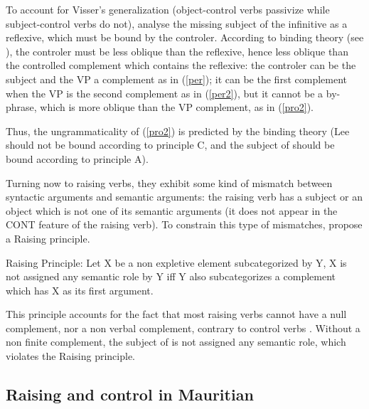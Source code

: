 \documentclass[output=paper]{langsci/langscibook}
\begin{document}
To account for Visser's generalization (object-control verbs passivize  while subject-control verbs do not), \citet{SagandPollard1991} analyse the missing subject of the infinitive as a reflexive, which must be bound by the controler. According to binding theory (see ), the controler must be less oblique than the reflexive, hence less oblique than the controlled complement which contains the reflexive: the controler can be the subject and the VP a complement as in (\ref{per}); it can be the first complement when the VP is the second complement as in (\ref{per2}), but it cannot be a  by-phrase, which is more oblique than the VP complement, as in (\ref{pro2}).

\eal
{}
\zl

Thus, the ungrammaticality of (\ref{pro2}) is predicted by the binding theory (Lee should not be bound according to principle C, and the subject of  should be bound according to principle A).

Turning now to raising verbs, they exhibit some kind of mismatch between syntactic arguments and semantic arguments: the raising verb has a subject or an object which is not one of its semantic arguments (it does not appear in the CONT feature of the raising verb). To constrain this type of mismatches, \citet[140]{PollardandSag1994}propose a Raising principle.

\begin{exe}
\ex Raising Principle: Let X be a non expletive element subcategorized by Y, X is not assigned any semantic role by Y iff Y also subcategorizes a complement which has X as its first argument.
\end{exe}

This principle accounts for the fact  that most raising verbs cannot have a null complement, nor a non verbal complement, contrary to control verbs \citep{Jacobson1990}. Without a non finite complement, the subject of  is not assigned any semantic role, which violates the Raising principle.

\eal
{}
\zl


\subsection{Raising and control in Mauritian}
\end{document}
